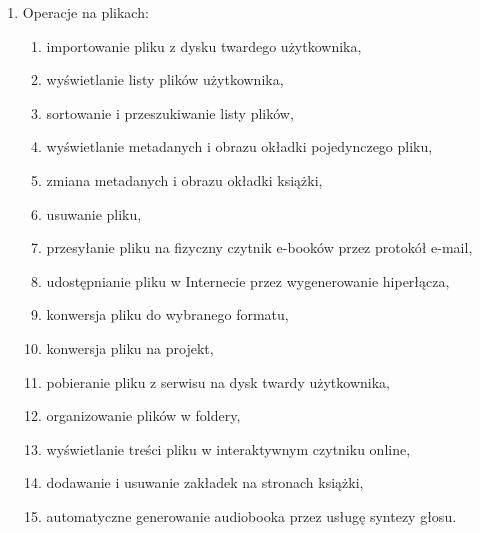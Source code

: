 \begin{enumerate}
    \item Operacje na plikach:
    \begin{enumerate}
        \item importowanie pliku z dysku twardego użytkownika,
        \item wyświetlanie listy plików użytkownika,
        \item sortowanie i przeszukiwanie listy plików,
        \item wyświetlanie metadanych i obrazu okładki pojedynczego pliku,
        \item zmiana metadanych i obrazu okładki książki,
        \item usuwanie pliku,
        \item przesyłanie pliku na fizyczny czytnik e-booków przez protokół e-mail,
        \item udostępnianie pliku w Internecie przez wygenerowanie hiperłącza,
        \item konwersja pliku do wybranego formatu,
        \item konwersja pliku na projekt,
        \item pobieranie pliku z serwisu na dysk twardy użytkownika,
        \item organizowanie plików w foldery,
        \item wyświetlanie treści pliku w interaktywnym czytniku online,
        \item dodawanie i usuwanie zakładek na stronach książki, 
        \item automatyczne generowanie audiobooka przez usługę syntezy głosu.
    \end{enumerate}
    

\end{enumerate}
